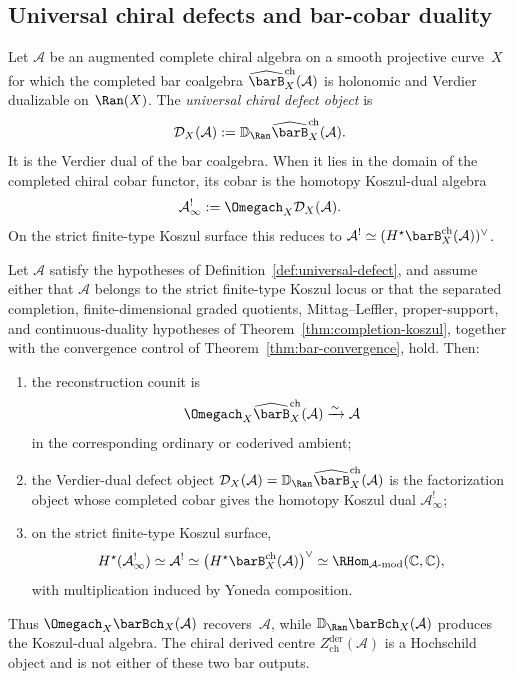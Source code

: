 \subsection{Universal chiral defects and bar-cobar duality}

\begin{definition}\label{def:universal-defect}
Let $\mathcal{A}$ be an augmented complete chiral algebra on a smooth
projective curve~$X$ for which the completed bar coalgebra
$\widehat{\barB}^{\mathrm{ch}}_X(\mathcal A)$ is holonomic and
Verdier dualizable on $\Ran(X)$.  The \emph{universal chiral defect
object} is
\[
\mathcal{D}_X(\mathcal A):=
\mathbb{D}_{\Ran}\widehat{\barB}^{\mathrm{ch}}_X(\mathcal A).
\]
It is the Verdier dual of the bar coalgebra.  When it lies in the
domain of the completed chiral cobar functor, its cobar is the
homotopy Koszul-dual algebra
\[
\mathcal A^!_\infty
:=\Omegach_X\mathcal{D}_X(\mathcal A).
\]
On the strict finite-type Koszul surface this reduces to
$\mathcal A^!\simeq (H^\star\barB^{\mathrm{ch}}_X(\mathcal A))^\vee$.
\end{definition}

\begin{theorem}\label{thm:defect-koszul}
Let $\mathcal A$ satisfy the hypotheses of
Definition~\ref{def:universal-defect}, and assume either that
$\mathcal A$ belongs to the strict finite-type Koszul locus or that
the separated completion, finite-dimensional graded quotients,
Mittag--Leffler, proper-support, and continuous-duality hypotheses of
Theorem~\ref{thm:completion-koszul}, together with the convergence
control of Theorem~\ref{thm:bar-convergence}, hold.  Then:
\begin{enumerate}[label=\textup{(\roman*)}]
\item the reconstruction counit is
\[
\Omegach_X\widehat{\barB}^{\mathrm{ch}}_X(\mathcal A)
\xrightarrow{\sim}\mathcal A
\]
in the corresponding ordinary or coderived ambient;
\item the Verdier-dual defect object
$\mathcal{D}_X(\mathcal A)=
\mathbb{D}_{\Ran}\widehat{\barB}^{\mathrm{ch}}_X(\mathcal A)$
is the factorization object whose completed cobar gives the homotopy
Koszul dual $\mathcal A^!_\infty$;
\item on the strict finite-type Koszul surface,
\[
H^\star(\mathcal A^!_\infty)
\simeq
\mathcal A^!
\simeq
\bigl(H^\star\barB^{\mathrm{ch}}_X(\mathcal A)\bigr)^\vee
\simeq
\RHom_{\mathcal A\text{-mod}}(\mathbb C,\mathbb C),
\]
with multiplication induced by Yoneda composition.
\end{enumerate}
Thus $\Omegach_X\barBch_X(\mathcal A)$ recovers~$\mathcal A$, while
$\mathbb{D}_{\Ran}\barBch_X(\mathcal A)$ produces the
Koszul-dual algebra.  The chiral derived centre
$Z^{\mathrm{der}}_{\mathrm{ch}}(\mathcal A)$ is a Hochschild object
and is not either of these two bar outputs.
\end{theorem}

